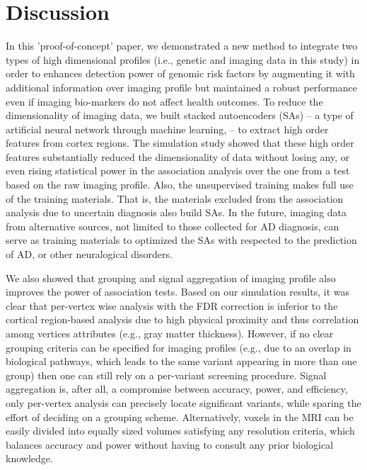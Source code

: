 \documentclass[11pt]{article}
\begin{document}
\section*{Discussion}
In this 'proof-of-concept' paper, we demonstrated a new method to integrate two types of high dimensional profiles (i.e., genetic and imaging data in this study) in order to enhances detection power of genomic risk factors by augmenting it with additional information over imaging profile but maintained a robust performance even if imaging bio-markers do not affect health outcomes. To reduce the dimensionality of imaging data, we built stacked autoencoders (SAs) -- a type of artificial neural network through machine learning, -- to extract high order features from cortex regions. The simulation study showed that these high order features substantially reduced the dimensionality of data without losing any, or even rising statistical power in the association analysis over the one from a test based on the raw imaging profile. Also, the unsupervised training makes full use of the training materials. That is, the materials excluded from the association analysis due to uncertain diagnosis also build SAs. In the future, imaging data from alternative sources, not limited to those collected for AD diagnosis, can serve as training materials to optimized the SAs with respected to the prediction of AD, or other neuralogical disorders.

We also showed that grouping and signal aggregation of imaging profile also improves the power of association tests. Based on our simulation results, it was clear that per-vertex wise analysis with the FDR correction is inferior to the cortical region-based analysis due to high physical proximity and thus correlation among vertices attributes (e.g., gray matter thickness). However, if no clear grouping criteria can be specified for imaging profiles (e.g., due to an overlap in biological pathways, which leads to the same variant appearing in more than one group) then one can still rely on a per-variant screening procedure. Signal aggregation is, after all, a compromise between accuracy, power, and efficiency, only per-vertex analysis can precisely locate significant variants, while sparing the effort of deciding on a grouping scheme. Alternatively, voxels in the MRI can be easily divided into equally sized volumes satisfying any resolution criteria, which balances accuracy and power without having to consult any prior biological knowledge.
\end{document}
